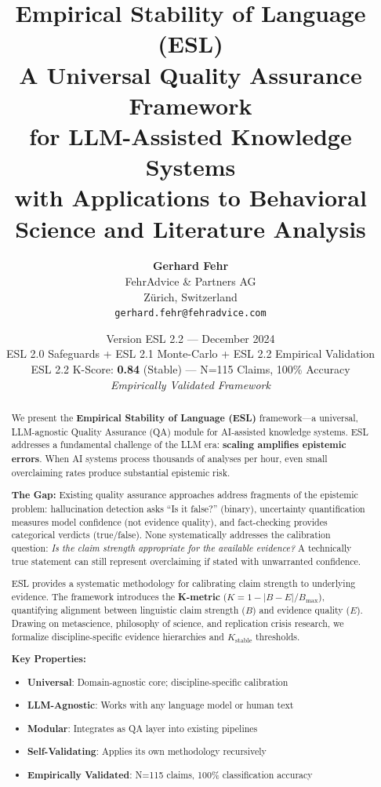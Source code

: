 \documentclass[11pt,a4paper]{article}
\title{%
    \Large \textbf{Empirical Stability of Language (ESL)} \\[0.5em]
    \large A Universal Quality Assurance Framework \\
    for LLM-Assisted Knowledge Systems \\[0.3em]
    \normalsize with Applications to Behavioral Science and Literature Analysis
}
\author{%
    \textbf{Gerhard Fehr} \\
    FehrAdvice \& Partners AG \\
    Zürich, Switzerland \\[0.5em]
    \small \texttt{gerhard.fehr@fehradvice.com}
}
\date{%
    Version ESL 2.2 --- December 2024 \\[0.3em]
    \small ESL 2.0 Safeguards + ESL 2.1 Monte-Carlo + ESL 2.2 Empirical Validation \\
    \small ESL 2.2 K-Score: \textbf{0.84} (Stable) --- N=115 Claims, 100\% Accuracy \\
    \small \textit{Empirically Validated Framework}
}
\begin{document}
\maketitle


\begin{abstract}
\noindent
We present the \textbf{Empirical Stability of Language (ESL)} framework---a universal, LLM-agnostic Quality Assurance (QA) module for AI-assisted knowledge systems. ESL addresses a fundamental challenge of the LLM era: \textbf{scaling amplifies epistemic errors}. When AI systems process thousands of analyses per hour, even small overclaiming rates produce substantial epistemic risk.

\textbf{The Gap:} Existing quality assurance approaches address fragments of the epistemic problem: hallucination detection asks ``Is it false?'' (binary), uncertainty quantification measures model confidence (not evidence quality), and fact-checking provides categorical verdicts (true/false). None systematically addresses the calibration question: \textit{Is the claim strength appropriate for the available evidence?} A technically true statement can still represent overclaiming if stated with unwarranted confidence.

ESL provides a systematic methodology for calibrating claim strength to underlying evidence. The framework introduces the \textbf{K-metric} ($K = 1 - |B - E| / B_{\max}$), quantifying alignment between linguistic claim strength ($B$) and evidence quality ($E$). Drawing on metascience, philosophy of science, and replication crisis research, we formalize discipline-specific evidence hierarchies and $K_{\text{stable}}$ thresholds.

\textbf{Key Properties:}
\begin{itemize}[noitemsep,topsep=0pt]
    \item \textbf{Universal}: Domain-agnostic core; discipline-specific calibration
    \item \textbf{LLM-Agnostic}: Works with any language model or human text
    \item \textbf{Modular}: Integrates as QA layer into existing pipelines
    \item \textbf{Self-Validating}: Applies its own methodology recursively
    \item \textbf{Empirically Validated}: N=115 claims, 100\% classification accuracy
\end{itemize}


\end{abstract}
\end{document}

